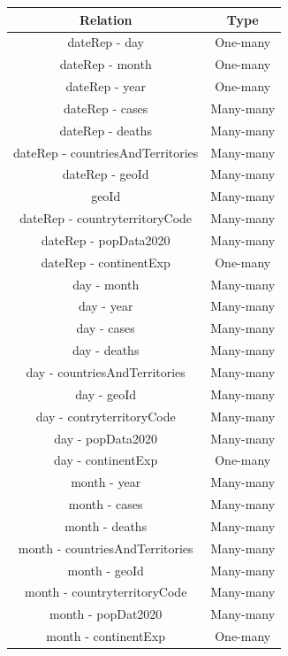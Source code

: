\documentclass[12pt,oneside,a4paper,english]{article}
\begin{document}
\small
 \begin{tabular}[t]{c c} %
  \hline\hline %
  \textbf{Relation} & \textbf{Type} \\ [0.3ex]
  \hline %
  dateRep - day & One-many\\ [0.3ex] 
  dateRep - month & One-many\\ [0.3ex]
  dateRep - year & One-many\\ [0.3ex]
  dateRep - cases & Many-many\\ [0.3ex]
  dateRep - deaths & Many-many\\ [0.3ex]
  dateRep - countriesAndTerritories & Many-many\\ [0.3ex]
  dateRep - geoId & Many-many\\ [0.3ex]
  geoId & Many-many\\ [0.3ex]
  dateRep - countryterritoryCode & Many-many\\ [0.3ex]
  dateRep - popData2020 & Many-many\\ [0.3ex]
  dateRep - continentExp & One-many\\ [0.3ex]
  day - month & Many-many\\ [0.3ex]
  day - year & Many-many\\ [0.3ex]
  day - cases & Many-many\\ [0.3ex]
  day - deaths & Many-many\\ [0.3ex]
  day - countriesAndTerritories & Many-many\\ [0.3ex]
  day - geoId & Many-many\\ [0.3ex]
  day - contryterritoryCode & Many-many\\ [0.3ex]
  day - popData2020 & Many-many\\ [0.3ex]
  day - continentExp & One-many\\ [0.3ex]
  month - year & Many-many\\ [0.3ex]
  month - cases & Many-many\\ [0.3ex]
  month - deaths & Many-many\\ [0.3ex]
  month - countriesAndTerritories & Many-many\\ [0.3ex]
  month - geoId & Many-many\\ [0.3ex]
  month - countryterritoryCode & Many-many\\ [0.3ex]
  month - popDat2020 & Many-many\\ [0.3ex]
  month - continentExp & One-many\\ [0.3ex]
  \hline
  \end{tabular}
\end{document}
